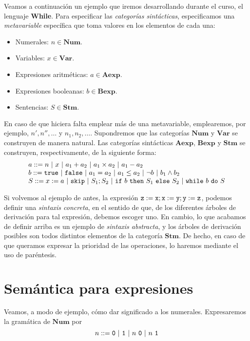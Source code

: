 Veamos a continuación un ejemplo que iremos desarrollando durante el curso, el lenguaje \textbf{While}. Para especificar las \textit{categorías sintácticas}, especificamos una \textit{metavariable} específica que toma valores en los elementos de cada una:
\begin{itemize}
    \item Numerales: $n\in \mathbf{Num}$.
    \item Variables: $x\in \mathbf{Var}$.
    \item Expresiones aritméticas: $a\in \mathbf{Aexp}$.
    \item Expresiones booleanas: $b\in \mathbf{Bexp}$.
    \item Sentencias: $S\in \mathbf{Stm}$.
\end{itemize}
En caso de que hiciera falta emplear más de una metavariable, emplearemos, por ejemplo, $n', n'', \dots$ y $n_1, n_2, \dots$. Supondremos que las categorías $\mathbf{Num}$ y $ \mathbf{Var}$ se construyen de manera natural. Las categorías sintácticas $\mathbf{Aexp}$, $\mathbf{Bexp}$ y $\mathbf{Stm}$ se construyen, respectivamente, de la siguiente forma:
\[
    \begin{array}{l}
         a ::= n\ |\ x\ |\ a_1+ a_2\ |\ a_1\times a_2\ |\ a_1-a_2 \\
         b ::= \n{true}\ |\ \n{false}\ |\ a_1 = a_2\ |\ a_1 \leq a_2\ |\ \neg b\ |\ b_1 \land b_2 \\
         S ::= x:=a\ |\ \n{skip}\ |\ S_1;S_2\ |\ \n{if}\ b\ \n{then}\ S_1\ \n{else}\ S_2\ |\ \n{while}\ b\ \n{do}\ S
         
    \end{array}
\]


Si volvemos al ejemplo de antes, la expresión $\texttt{z} := \texttt{x}; \texttt{x} := \texttt{y}; \texttt{y} := \texttt{z}$, podemos definir una \textit{sintaxis concreta}, en el sentido de que, de los diferentes árboles de derivación para tal expresión, debemos escoger uno. En cambio, lo que acabamos de definir arriba es un ejemplo de \textit{sintaxis abstracta}, y los árboles de derivación posibles son todos distintos elementos de la categoría $\mathbf{Stm}$. De hecho, en caso de que queramos expresar la prioridad de las operaciones, lo haremos mediante el uso de paréntesis.

\section{Semántica para expresiones}

Veamos, a modo de ejemplo, cómo dar significado a los numerales. Expresaremos la gramática de $\mathbf{Num}$ por
\[
    n ::= \n{0}\ |\ \n{1} \ |\ n\ \n{0} \ |\ n\ \n{1}
\]

